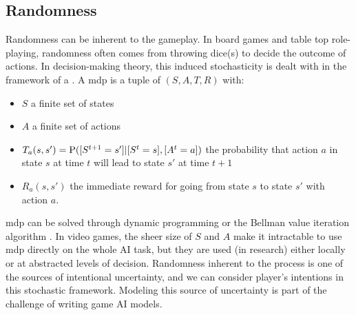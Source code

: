 \subsection{Randomness}
Randomness can be inherent to the gameplay. In board games and table top role-playing, randomness often comes from throwing dice(s) to decide the outcome of actions. In decision-making theory, this induced stochasticity is dealt with in the framework of a . A \gls{mdp} is a tuple of $(S,A,T,R)$ with:
\begin{itemize}
    \item $S$ a finite set of states
    \item $A$ a finite set of actions
    \item $T_a(s,s') = \mathrm{P}([S^{t+1}=s']|[S^t=s],[A^t=a])$ the probability that action $a$ in state $s$ at time $t$ will lead to state $s'$ at time $t+1$
    \item $R_a(s,s')$ the immediate reward for going from state $s$ to state $s'$ with action $a$.
\end{itemize}
\gls{mdp} can be solved through dynamic programming or the Bellman value iteration algorithm \citep{Bellman}. In video games, the sheer size of $S$ and $A$ make it intractable to use \gls{mdp} directly on the whole AI task, but they are used (in research) either locally or at abstracted levels of decision. Randomness inherent to the process is one of the sources of intentional uncertainty, and we can consider player's intentions in this stochastic framework. Modeling this source of uncertainty is part of the challenge of writing game AI models.

